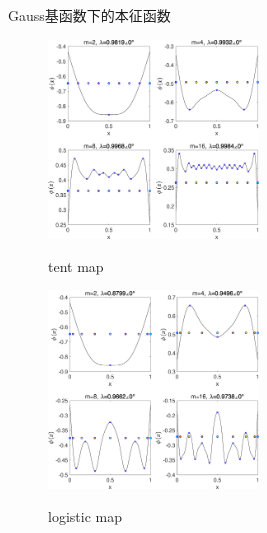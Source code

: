 \documentclass{beamer}
\begin{document}
      \begin{frame}{Gauss基函数下的本征函数}
      	\begin{figure}
      		\begin{minipage}{0.45\linewidth}
      			\centerline{\includegraphics[width=2.2in]{images/03a-Tent_eigen_Gauss_n1000_m2-4-8-16_d0.eps}}
      			\centerline{tent map}
      		\end{minipage}
      		\hfill
      		\begin{minipage}{0.45\linewidth}
      			\centerline{\includegraphics[width=2.2in]{images/03b-Logistic_eigen_Gauss_n1000_m2-4-8-16_d0.eps}}
      			\centerline{logistic map}
      		\end{minipage}
       \end{figure}
      \end{frame}
\end{document}
